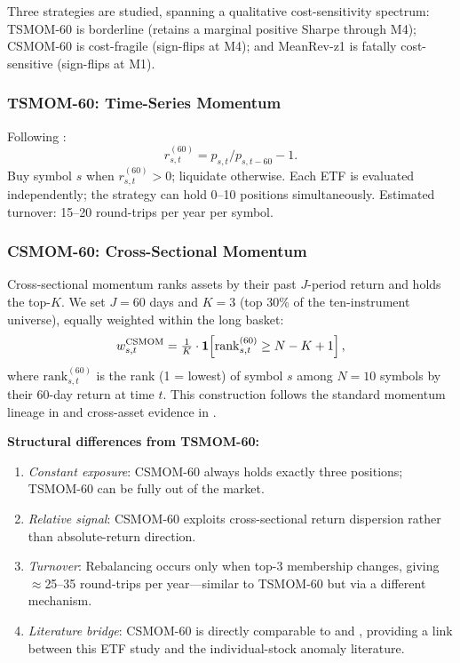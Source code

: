 \documentclass[12pt]{article}
\begin{document}
Three strategies are studied, spanning a qualitative cost-sensitivity
spectrum: TSMOM-60 is borderline (retains a marginal positive Sharpe
through M4); CSMOM-60 is cost-fragile (sign-flips at M4); and
MeanRev-z1 is fatally cost-sensitive (sign-flips at M1).

\subsubsection{TSMOM-60: Time-Series Momentum}

Following \citet{moskowitz2012time}:
\begin{equation}
  r^{(60)}_{s,t} = p_{s,t}/p_{s,t-60} - 1.
  \label{eq:tsmom}
\end{equation}
Buy symbol $s$ when $r^{(60)}_{s,t} > 0$; liquidate otherwise.
Each ETF is evaluated independently; the strategy can hold 0--10
positions simultaneously. Estimated turnover: 15--20 round-trips
per year per symbol.

\subsubsection{CSMOM-60: Cross-Sectional Momentum}
\label{sec:csmom_spec}

Cross-sectional momentum \citep{jegadeesh1993returns} ranks assets
by their past $J$-period return and holds the top-$K$. We set $J = 60$
days and $K = 3$ (top 30\% of the ten-instrument universe), equally
weighted within the long basket:
\begin{equation}
  w^{\rm CSMOM}_{s,t} = \tfrac{1}{K} \cdot
    \mathbf{1}\!\left[\mathrm{rank}_{s,t}^{(60)} \ge N-K+1\right],
  \label{eq:csmom}
\end{equation}
where $\mathrm{rank}_{s,t}^{(60)}$ is the rank (1 = lowest) of symbol
$s$ among $N = 10$ symbols by their 60-day return at time $t$.
This construction follows the standard momentum lineage in
\citet{carhart1997persistence} and cross-asset evidence in
\citet{asness2013value}.

\textbf{Structural differences from TSMOM-60:}
\begin{enumerate}[nosep]
  \item \emph{Constant exposure}: CSMOM-60 always holds exactly three
    positions; TSMOM-60 can be fully out of the market.
  \item \emph{Relative signal}: CSMOM-60 exploits cross-sectional
    return dispersion rather than absolute-return direction.
  \item \emph{Turnover}: Rebalancing occurs only when top-3 membership
    changes, giving $\approx$25--35 round-trips per year---similar to
    TSMOM-60 but via a different mechanism.
  \item \emph{Literature bridge}: CSMOM-60 is directly comparable to
    \citet{jegadeesh1993returns} and \citet{novymarx2016taxonomy},
    providing a link between this ETF study and the individual-stock
    anomaly literature.
\end{enumerate}
\end{document}

